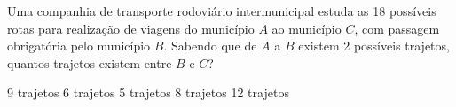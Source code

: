 Uma companhia de transporte rodoviário intermunicipal estuda as 18 possíveis rotas para realização de viagens do município $A$ ao município $C$, com passagem obrigatória pelo município $B$. Sabendo que de $A$ a $B$ existem 2 possíveis trajetos, quantos trajetos existem entre $B$ e $C$?

9 trajetos
6 trajetos
5 trajetos
8 trajetos
12 trajetos



